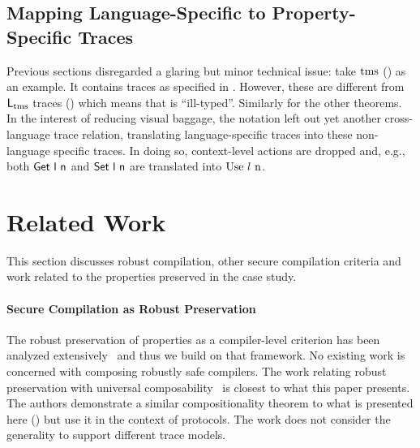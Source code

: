 \documentclass[dvipsnames,conference]{IEEEtran}
\theoremstyle{definition}
\begin{document}
\subsection{Mapping Language-Specific to Property-Specific Traces}\label{subsec:formalities:maps}

Previous sections disregarded a glaring but minor technical issue: take $\operatorname{tms}$ () as an example.
It contains traces as specified in .
However, these are different from $\mathsf{L_{\operatorname{tms}}}$ traces () which means that  is ``ill-typed''.
Similarly for the other theorems.
In the interest of reducing visual baggage, the notation left out yet another cross-language trace relation, translating language-specific traces into these non-language specific traces. 
In doing so, context-level actions are dropped and, e.g., both $\src{Get\ \loc\ n}$ and $\mathsf{Set\ l\ n}$ are translated into $\ev{Use\ \loc\ n}$.

\section{Related Work}\label{sec:relwork}

This section discusses robust compilation, other secure compilation criteria and work related to the properties preserved in the case study.

\paragraph*{Secure Compilation as Robust Preservation}\label{subsec:relw:seccomprtp}

The robust preservation of properties as a compiler-level criterion has been analyzed extensively~\cite{abate2019jour,patrignani2021rsc,abate2021extacc,patrignani2019survey} and thus we build on that framework.
No existing work is concerned with composing robustly safe compilers.
The work relating robust preservation with universal composability~\cite{patrignani2022universal} is closest to what this paper presents.
The authors demonstrate a similar compositionality theorem to what is presented here () but use it in the context of protocols.
The work does not consider the generality to support different trace models.
\end{document}
